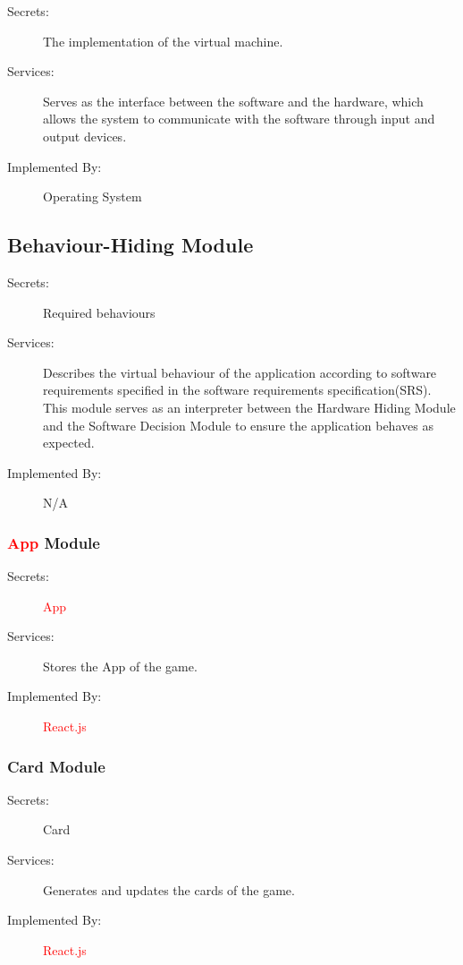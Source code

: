 \documentclass[12pt, titlepage]{article}
\begin{document}
\begin{description}
\item[Secrets:]The implementation of the virtual machine.
\item[Services:]Serves as the interface between the software and the hardware, which allows the system to communicate with the software through input and output devices.  
\item[Implemented By:] Operating System
\end{description}

\subsection{Behaviour-Hiding Module}

\begin{description}
\item[Secrets:] Required behaviours
\item[Services:] Describes the virtual behaviour of the application according to software requirements specified in the software requirements specification(SRS). This module serves as an interpreter between the Hardware Hiding Module and the Software Decision Module to ensure the application behaves as expected.
\item[Implemented By:] N/A
\end{description}

\subsubsection{\textcolor{red}{App} Module}

\begin{description}
\item[Secrets:] \textcolor{red}{App}
\item[Services:] Stores the App of the game.
\item[Implemented By:] \textcolor{red}{React.js}
\end{description}

\subsubsection{Card Module}

\begin{description}
\item[Secrets:] Card
\item[Services:] Generates and updates the cards of the game.
\item[Implemented By:] \textcolor{red}{React.js}
\end{description}
\end{document}

